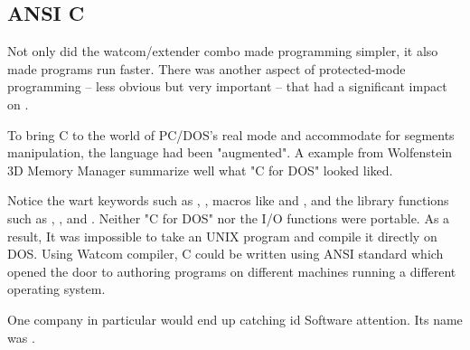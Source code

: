 \subsection{ANSI C}
Not only did the watcom/extender combo made programming simpler, it also made programs run faster. There was another aspect of protected-mode programming -- less obvious but very important -- that had a significant impact on \doom.\\
\par
To bring C to the world of PC/DOS's real mode and accommodate for segments manipulation, the language had been "augmented". A example from Wolfenstein 3D Memory Manager summarize well what "C for DOS" looked liked.\\
\par
{}
\par
Notice the wart keywords such as , , macros like  and , and the  library functions such as , , and . Neither "C for DOS" nor the I/O functions were portable. As a result, It was impossible to take an UNIX program and compile it directly on DOS. Using Watcom compiler, C could be written using ANSI standard which opened the door to authoring programs on different machines running a different operating system.\\
\par
 One company in particular would end up catching id Software attention. Its name was \NeXT.
